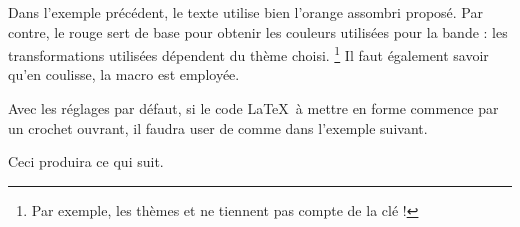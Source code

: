 \documentclass{../main/main}
\begin{document}
\begin{tdocnote}
    Dans l'exemple précédent, le texte utilise bien l'orange assombri proposé. Par contre, le rouge sert de base pour obtenir les couleurs utilisées pour la bande : les transformations utilisées dépendent du thème choisi.%
    \footnote{
        Par exemple, les thèmes  et  ne tiennent pas compte de la clé  !
    }
    Il faut également savoir qu'en coulisse, la macro  est employée.

    \begin{tdoclatex}[std]
    \end{tdoclatex}
\end{tdocnote}


\begin{tdocwarn}
    Avec les réglages par défaut, si le code \LaTeX\ à mettre en forme commence par un crochet ouvrant, il faudra user de  comme dans l'exemple suivant.


    Ceci produira ce qui suit.
\end{tdocwarn}


\end{document}
